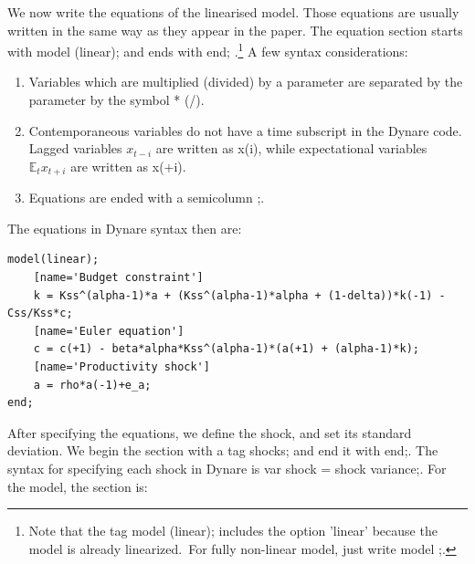 \documentclass[a4paper,12pt]{article}%
\begin{document}
We now write the equations of the linearised model. Those equations are
usually written in the same way as they appear in the paper. The equation
section starts with \textsf{model (linear);} and ends with \textsf{end;}%
.\footnote{Note that the tag \textsf{model (linear);} includes the option
'linear' because the model is already linearized.\ For fully non-linear model,
just write \textsf{model ;}.} A few syntax considerations:

\begin{enumerate}
\item Variables which are multiplied (divided) by a parameter are separated by
the parameter by the symbol * (/).

\item Contemporaneous variables do not have a time subscript in the Dynare
code. Lagged variables $x_{t-i}$ are written as \textsf{x(i)}, while
expectational variables $\mathbb{E}_{t}x_{t+i}$ are written as \textsf{x(+i)}.

\item Equations are ended with a semicolumn ;.
\end{enumerate}

The equations in Dynare syntax then are:%

\vspace{1ex}
\begin{verbatim}
model(linear);
	[name='Budget constraint']
	k = Kss^(alpha-1)*a + (Kss^(alpha-1)*alpha + (1-delta))*k(-1) - Css/Kss*c;
	[name='Euler equation']
	c = c(+1) - beta*alpha*Kss^(alpha-1)*(a(+1) + (alpha-1)*k);
	[name='Productivity shock']
	a = rho*a(-1)+e_a;
end;
\end{verbatim}
\vspace{1ex}%


After specifying the equations, we define the shock, and set its standard
deviation. We begin the section with a tag \textsf{shocks;} and end it with
\textsf{end;}. The syntax for specifying each shock in Dynare is \textsf{var
shock = shock variance;}. For the model, the section is:%
\end{document}
